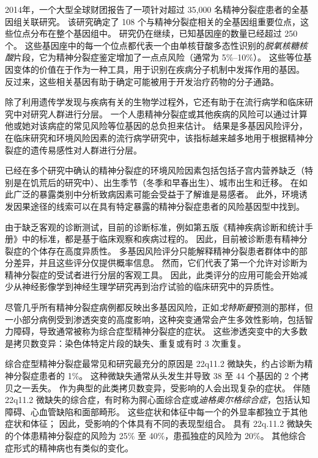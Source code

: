2014年，一个大型全球财团报告了一项针对超过 35,000 名精神分裂症患者的全基因组关联研究。
该研究确定了 108 个与精神分裂症相关的全基因组重要位点，这些位点分布在整个基因组中。
研究仍在继续，已知基因座的数量已经超过 250 个。
这些基因座中的每一个位点都代表一个由单核苷酸多态性识别的\textit{脱氧核糖核酸}片段，它为精神分裂症鉴定增加了一点点风险（通常为 5\%–10\%）。
这些等位基因变体的价值在于作为一种工具，用于识别在疾病分子机制中发挥作用的基因。
反过来，这些相关基因有助于确定可能被用于开发治疗药物的分子通路。


除了利用遗传学发现与疾病有关的生物学过程外，它还有助于在流行病学和临床研究中对研究人群进行分层。
一个人患精神分裂症或其他疾病的风险可以通过计算他或她对该病症的常见风险等位基因的总负担来估计。
结果是多基因风险评分，在临床研究和环境风险因素的流行病学研究中，该指标越来越多地用于根据精神分裂症的遗传易感性对人群进行分层。


已经在多个研究中确认的精神分裂症的环境风险因素包括包括子宫内营养缺乏（特别是在饥荒后的研究中）、出生季节（冬季和早春出生）、城市出生和迁移。
在如此广泛的暴露类别中分析致病因素可能会受益于了解谁是易感者。
此外，环境诱发因果途径的线索可以在具有特定暴露的精神分裂症患者的风险基因型中找到。


由于缺乏客观的诊断测试，目前的诊断标准，例如第五版《精神疾病诊断和统计手册》中的标准，都是基于临床观察和疾病过程的。
因此，目前被诊断患有精神分裂症的个体存在高度异质性。
多基因风险评分只能解释精神分裂患者群体中的部分差异，并且这些评分仅提供概率信息。
然而，它们代表了第一个允许对诊断为精神分裂症的受试者进行分层的客观工具。
因此，此类评分的应用可能会开始减少从神经影像学到神经生理学研究再到治疗试验的临床研究中的异质性。


尽管几乎所有精神分裂症病例都反映出多基因风险，正如\textit{戈特斯曼}预测的那样，但一小部分病例受到渗透突变的高度影响，这种突变通常会产生多效性影响，包括智力障碍，导致通常被称为综合症型精神分裂症的症状。
这些渗透突变中的大多数是拷贝数变异：染色体特定片段的缺失、重复或有时 3 次重复。


综合症型精神分裂症最常见和研究最充分的原因是 22q11.2 微缺失，约占诊断为精神分裂症患者的 1\%。
这种微缺失通常从头发生并导致 38 至 44 个基因的 2 个拷贝之一丢失。
作为典型的此类拷贝数变异，受影响的人会出现复杂的症状。
伴随 22q11.2 微缺失的综合症，有时称为腭心面综合症或\textit{迪格奥尔格综合症}，包括认知障碍、心血管缺陷和面部畸形。
这些症状和体征中每一个的外显率都独立于其他症状和体征；
因此，受影响的个体具有不同的表现型组合。
具有 22q.11.2 微缺失的个体患精神分裂症的风险为 25\% 至 40\%，患孤独症的风险为 20\%。
其他综合症形式的精神病也有类似的变化。



